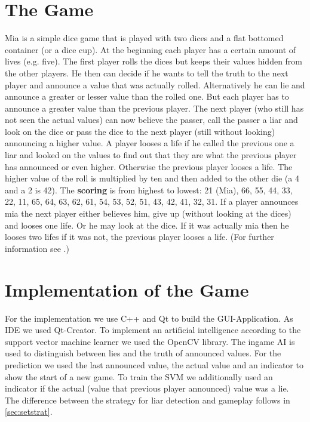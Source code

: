 \documentclass[11pt]{article}
\begin{document}
\section{The Game}
Mia is a simple dice game that is played with two dices and a flat bottomed container (or a dice cup). At the beginning each player has a certain amount of lives (e.g. five).
The first player rolls the dices but keeps their values hidden from the other players. He then can decide if he wants to tell the truth to the next player and announce a value that was actually rolled. Alternatively he can lie and announce a greater or lesser value than the rolled one.
But each player has to announce a greater value than the previous player.
The next player (who still has not seen the actual values) can now believe the passer, call the passer a liar and look on the dice or pass the dice to the next player (still without looking) announcing a higher value. 
A player looses a life if he called the previous one a liar and looked on the values to find out that they are what the previous player has announced or even higher. Otherwise the previous player looses a life. 
The higher value of the roll is multiplied by ten and then added to the other die (a 4 and a 2 is 42). 
The \textbf{scoring} is from highest to lowest:  21 (Mia), 66, 55, 44, 33, 22, 11, 65, 64, 63, 62, 61, 54, 53, 52, 51, 43, 42, 41, 32, 31.
If a player announces mia the next player either believes him, give up (without looking at the dices) and looses one life. Or he may look at the dice. If it was actually mia then he looses two lifes if it was not, the previous player looses a life. (For further information see \cite{mia:2016}.)

\section{Implementation of the Game}
For the implementation we use C++ and Qt to build the GUI-Application. As IDE we used Qt-Creator. To implement an artificial intelligence according to the support vector machine learner we used the OpenCV library.
The ingame AI is used to distinguish between lies and the truth of announced values.
For the prediction we used the last announced value, the actual value and an indicator to show the start of a new game. 
To train the SVM we additionally used an indicator if the actual (value that previous player announced) value was a lie.\\
The difference between the strategy for liar detection and gameplay  follows in \cref{sec:setstrat}.
\end{document}
